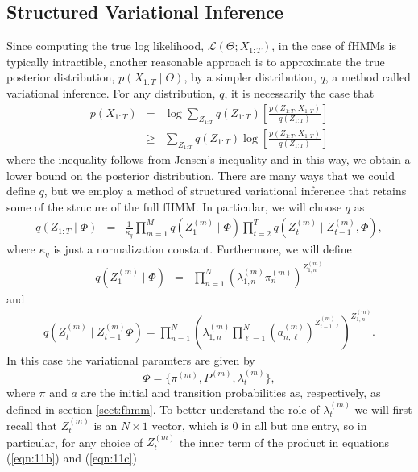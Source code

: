 \documentclass{amsart}
\begin{document}
\subsection{Structured Variational Inference}

Since computing the true log likelihood, $\mathcal L (\Theta; X_{1:T})$, 
in the case of fHMMs is typically intractible, another reasonable approach is to approximate 
the true posterior distribution, $p(X_{1:T}\mid \Theta)$, by a 
simpler distribution, $q$, a method called variational inference. For 
any distribution, $q$, it is necessarily the case that 
\begin{eqnarray*}
p(X_{1:T}) & =& 
\log\sum_{Z_{1:T}}q(Z_{1:T})\left[\frac{p(Z_{1:T},X_{1:T})}{q(Z_{1:T})}\right]\\
&\geq& 
\sum_{Z_{1:T}}q(Z_{1:T})\log \left[\frac{p(Z_{1:T},X_{1:T})}{q(Z_{1:T})}\right]
\end{eqnarray*} 
where the inequality follows from Jensen's inequality and in this way, we 
obtain a lower bound on the posterior distribution. There are many ways 
that we could define $q$, but we employ a method of structured 
variational inference that retains some of the strucure of the full 
fHMM.  In particular, we will choose $q$ as 
\begin{eqnarray*}
q(Z_{1:T}\mid \Phi) &=& \frac{1}{\kappa_q}\prod_{m=1}^M q(Z_1^{(m)}\mid 
\Phi)\prod_{t=2}^T q(Z_t^{(m)}\mid Z_{t-1}^{(m)}, \Phi),
\end{eqnarray*}
where $\kappa_q$ is just a normalization constant. Furthermore, we will 
define 
\begin{eqnarray}\label{eqn:11b}
q(Z_1^{(m)}\mid \Phi) &=& 
\prod_{n=1}^N\left(\lambda_{1,n}^{(m)}\pi_n^{(m)}\right)^{Z_{1,n}^{(m)}}
\end{eqnarray}
and 
\begin{eqnarray}\label{eqn:11c}
q(Z_t^{(m)}\mid Z_{t-1}^{(m)}\Phi) = 
\prod_{n=1}^N\left(\lambda_{1,n}^{(m)}\prod_{\ell=1}^N 
\left(a_{n,\ell}^{(m)}\right)^{Z_{t-1,\ell}^{(m)}}\right)^{Z_{1,n}^{(m)}}.
\end{eqnarray}
In this case the variational paramters are given by 
\[
\Phi = \{\pi^{(m)}, P^{(m)}, \lambda_t^{(m)}\},
\]
where $\pi$ and $a$ are the initial and transition probabilities as, 
respectively, as defined in section \ref{sect:fhmm}.  To better 
understand the role of $\lambda_t^{(m)}$ we will first recall that 
$Z_t^{(m)}$ is an $N\times 1$ vector, which is 0 in all but one entry, 
so in particular, for any choice of $Z_t^{(m)}$ the inner term of the 
product in equations (\ref{eqn:11b}) and (\ref{eqn:11c}) 
\end{document}
